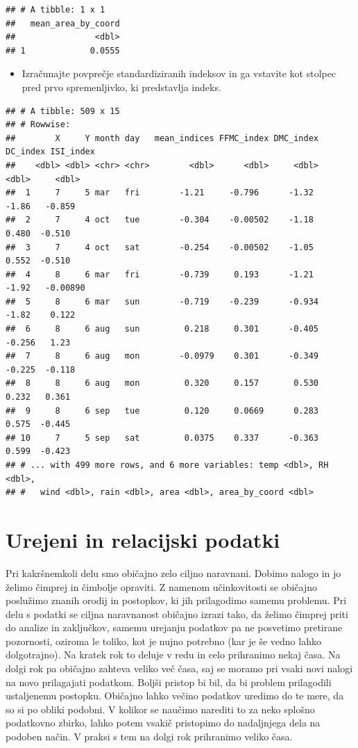 \documentclass[
]{book}
\providecommand{\tightlist}{%
  \setlength{\itemsep}{0pt}\setlength{\parskip}{0pt}}
\begin{document}
\begin{enumerate}
\begin{verbatim}
## # A tibble: 1 x 1
##   mean_area_by_coord
##                <dbl>
## 1             0.0555
\end{verbatim}

  \begin{itemize}
  \tightlist
  \item
    Izračunajte povprečje standardiziranih indeksov in ga vstavite kot stolpec pred prvo spremenljivko, ki predstavlja indeks.
  \end{itemize}

\begin{verbatim}
## # A tibble: 509 x 15
## # Rowwise: 
##        X     Y month day   mean_indices FFMC_index DMC_index DC_index ISI_index
##    <dbl> <dbl> <chr> <chr>        <dbl>      <dbl>     <dbl>    <dbl>     <dbl>
##  1     7     5 mar   fri        -1.21     -0.796      -1.32    -1.86   -0.859  
##  2     7     4 oct   tue        -0.304    -0.00502    -1.18     0.480  -0.510  
##  3     7     4 oct   sat        -0.254    -0.00502    -1.05     0.552  -0.510  
##  4     8     6 mar   fri        -0.739     0.193      -1.21    -1.92   -0.00890
##  5     8     6 mar   sun        -0.719    -0.239      -0.934   -1.82    0.122  
##  6     8     6 aug   sun         0.218     0.301      -0.405   -0.256   1.23   
##  7     8     6 aug   mon        -0.0979    0.301      -0.349   -0.225  -0.118  
##  8     8     6 aug   mon         0.320     0.157       0.530    0.232   0.361  
##  9     8     6 sep   tue         0.120     0.0669      0.283    0.575  -0.445  
## 10     7     5 sep   sat         0.0375    0.337      -0.363    0.599  -0.423  
## # ... with 499 more rows, and 6 more variables: temp <dbl>, RH <dbl>,
## #   wind <dbl>, rain <dbl>, area <dbl>, area_by_coord <dbl>
\end{verbatim}
\end{enumerate}

\hypertarget{urejeni-in-relacijski-podatki}{%
\chapter{Urejeni in relacijski podatki}\label{urejeni-in-relacijski-podatki}}

Pri kakršnemkoli delu smo običajno zelo ciljno naravnani. Dobimo nalogo in jo želimo čimprej in čimbolje opraviti. Z namenom učinkovitosti se običajno poslužimo znanih orodij in postopkov, ki jih prilagodimo samemu problemu. Pri delu s podatki se ciljna naravnanost običajno izrazi tako, da želimo čimprej priti do analize in zaključkov, samemu urejanju podatkov pa ne posvetimo pretirane pozornosti, oziroma le toliko, kot je nujno potrebno (kar je še vedno lahko dolgotrajno). Na kratek rok to deluje v redu in celo prihranimo nekaj časa. Na dolgi rok pa običajno zahteva veliko več časa, saj se moramo pri vsaki novi nalogi na novo prilagajati podatkom. Boljši pristop bi bil, da bi problem prilagodili ustaljenemu postopku. Običajno lahko večino podatkov uredimo do te mere, da so si po obliki podobni. V kolikor se naučimo narediti to za neko splošno podatkovno zbirko, lahko potem vsakič pristopimo do nadaljnjega dela na podoben način. V praksi s tem na dolgi rok prihranimo veliko časa.
\end{document}
